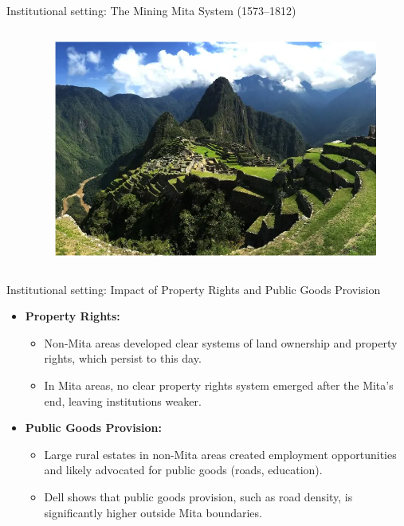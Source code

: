 \documentclass[notes,11pt, aspectratio=169]{beamer}
\begin{document}
\begin{frame}{Institutional setting: The Mining Mita System (1573–1812)}
\begin{columns}[T]
\begin{column}{.58\textwidth}
\begin{minipage}[t][\textheight][t]
    \end{minipage}
\end{column}%
\hfill%
\begin{column}{.42\textwidth}
 \colorbox{green!20}{\begin{minipage}[t][1.5\textheight][t]
      {\dimexpr\textwidth}
    \begin{figure}
    \centering
    \includegraphics[width=0.8\linewidth]{Picture2.png}
    \label{fig:enter-label}
\end{figure}    \end{minipage}}
\end{column}%
\end{columns}
\end{frame}


\begin{frame}{Institutional setting: Impact of Property Rights and Public Goods Provision}
    \begin{itemize}
        \item \textbf{Property Rights:}
            \begin{itemize}
                \item Non-Mita areas developed clear systems of land ownership and property rights, which persist to this day.
                \item In Mita areas, no clear property rights system emerged after the Mita's end, leaving institutions weaker.
            \end{itemize}
        \item \textbf{Public Goods Provision:}
            \begin{itemize}
                \item Large rural estates in non-Mita areas created employment opportunities and likely advocated for public goods (roads, education).
                \item Dell shows that public goods provision, such as road density, is significantly higher outside Mita boundaries.
            \end{itemize}
    \end{itemize}
\end{frame}
\end{document}
